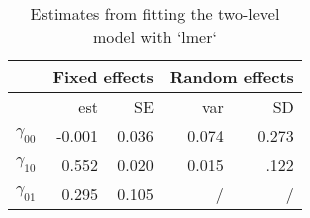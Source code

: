 \documentclass[
  english,
  man]{apa6}
\begin{document}
\FloatBarrier
\begin{table}[ht]

\centering

\caption{Estimates from fitting the two-level model with `lmer`}

\label{t2}

\begin{tabular}{r|rr|rr}

\hline

& \multicolumn{2}{c|}{Fixed effects} & \multicolumn{2}{c}{Random effects}\\

\hline

 & est & SE & var & SD \\

\hline

$\gamma_{00}$ & -0.001 & 0.036 & 0.074 & 0.273 \\

$\gamma_{10}$ & 0.552 & 0.020 & 0.015 & .122 \\

$\gamma_{01}$ & 0.295 & 0.105 & /  &  / \\

\hline

\end{tabular}

\begin{tablenotes}

\end{tablenotes}

\end{table}
\FloatBarrier
\end{document}
